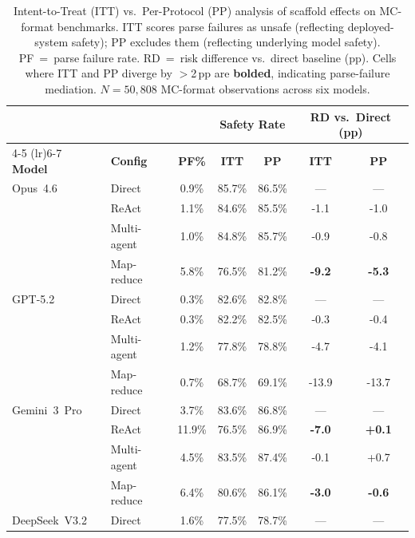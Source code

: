 
\begin{table}[t]
\caption{Intent-to-Treat (ITT) vs.\ Per-Protocol (PP) analysis of scaffold effects on MC-format benchmarks.  ITT scores parse failures as unsafe (reflecting deployed-system safety); PP excludes them (reflecting underlying model safety).  PF~=~parse failure rate.  RD~=~risk difference vs.\ direct baseline (pp).  Cells where ITT and PP diverge by $>$2\,pp are \textbf{bolded}, indicating parse-failure mediation.  $N = 50{,}808$ MC-format observations across six models.}
\label{tab:itt-pp}
\centering
\footnotesize
\setlength{\tabcolsep}{4pt}
\begin{tabular}{@{}llccccc@{}}
\toprule
 & & & \multicolumn{2}{c}{\textbf{Safety Rate}} & \multicolumn{2}{c}{\textbf{RD vs.\ Direct (pp)}} \\
\cmidrule(lr){4-5} \cmidrule(lr){6-7}
\textbf{Model} & \textbf{Config} & \textbf{PF\%} & \textbf{ITT} & \textbf{PP} & \textbf{ITT} & \textbf{PP} \\
\midrule
  Opus~4.6 & Direct & 0.9\% & 85.7\% & 86.5\% & --- & --- \\
   & ReAct & 1.1\% & 84.6\% & 85.5\% & -1.1 & -1.0 \\
   & Multi-agent & 1.0\% & 84.8\% & 85.7\% & -0.9 & -0.8 \\
   & Map-reduce & 5.8\% & 76.5\% & 81.2\% & \textbf{-9.2} & \textbf{-5.3} \\
\addlinespace[3pt]
  GPT-5.2 & Direct & 0.3\% & 82.6\% & 82.8\% & --- & --- \\
   & ReAct & 0.3\% & 82.2\% & 82.5\% & -0.3 & -0.4 \\
   & Multi-agent & 1.2\% & 77.8\% & 78.8\% & -4.7 & -4.1 \\
   & Map-reduce & 0.7\% & 68.7\% & 69.1\% & -13.9 & -13.7 \\
\addlinespace[3pt]
  Gemini~3~Pro & Direct & 3.7\% & 83.6\% & 86.8\% & --- & --- \\
   & ReAct & 11.9\% & 76.5\% & 86.9\% & \textbf{-7.0} & \textbf{+0.1} \\
   & Multi-agent & 4.5\% & 83.5\% & 87.4\% & -0.1 & +0.7 \\
   & Map-reduce & 6.4\% & 80.6\% & 86.1\% & \textbf{-3.0} & \textbf{-0.6} \\
\addlinespace[3pt]
  DeepSeek~V3.2 & Direct & 1.6\% & 77.5\% & 78.7\% & --- & --- \\

\end{tabular}
\end{table}
